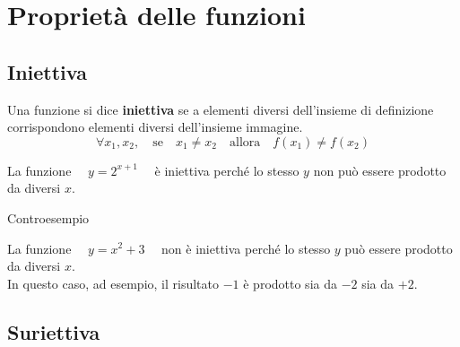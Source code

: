 
\section{Proprietà delle funzioni}
\label{sec:funzioni2_proprieta}

\subsection{Iniettiva}

\begin{definizione}
Una funzione si dice \textbf{iniettiva} se a elementi diversi dell'insieme 
di definizione corrispondono elementi diversi dell'insieme immagine.
\[\forall x_1, x_2, \quad \text{se} \quad x_1 \ne x_2 
\quad \text{allora} \quad f(x_1) \ne f(x_2)\]
\end{definizione}

\begin{minipage}{.45\textwidth}
\begin{esempio}

La funzione \(\quad y = 2^{x+1} \quad\) è iniettiva perché lo stesso \(y\) non 
può essere prodotto da diversi \(x\).
\end{esempio}
\begin{center}
\end{center}

\end{minipage}
\hfill
\begin{minipage}{.45\textwidth}
\begin{esempio}Controesempio

La funzione \(\quad y = x^2+3 \quad\) non è iniettiva perché lo stesso \(y\) 
può essere prodotto da diversi \(x\).\\
In questo caso, ad esempio, il risultato \(-1\) è prodotto sia da \(-2\) sia 
da \(+2\).
\end{esempio}
\begin{center}
\end{center}
\end{minipage}

\subsection{Suriettiva}

